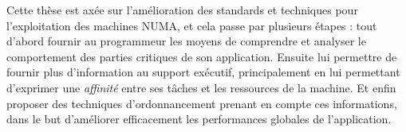 Cette thèse est axée sur l'amélioration des standards et techniques pour l'exploitation des machines NUMA, et cela passe par plusieurs étapes : tout d'abord fournir au programmeur les moyens de comprendre et analyser le comportement des parties critiques de son application.
Ensuite lui permettre de fournir plus d'information au support exécutif, principalement en lui permettant d'exprimer une \emph{affinité} entre ses tâches et les ressources de la machine.
Et enfin proposer des techniques d'ordonnancement prenant en compte ces informations, dans le but d'améliorer efficacement les performances globales de l'application.







